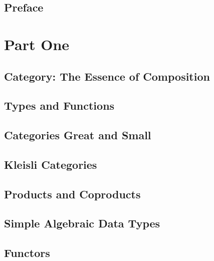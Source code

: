 \pagebreak
\tableofcontents

\chapter*{Preface}
\label{Preface}



\mainmatter

\part{Part One}

\chapter{Category: The Essence of Composition}\label{category-the-essence-of-composition}


\chapter{Types and Functions}\label{types-and-functions}


\chapter{Categories Great and Small}\label{categories-great-and-small}


\chapter{Kleisli Categories}\label{kleisli-categories-page}


\chapter{Products and Coproducts}\label{products-and-coproducts}


\chapter{Simple Algebraic Data Types}\label{simple-algebraic-data-types}


\chapter{Functors}\label{chap-functors}


